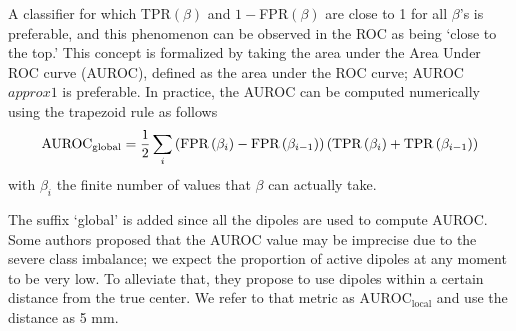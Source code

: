 A classifier for which TPR$(\beta)$ and $1-$FPR$(\beta)$ are close to 1 for all $\beta$'s is preferable, and this phenomenon can be observed in the ROC as being `close to the top.'
%
This concept is formalized by taking the area under the Area Under ROC curve (AUROC), defined as the area under the ROC curve; AUROC$approx 1$ is preferable.
%
In practice, the AUROC can be computed numerically using the trapezoid rule as follows
\begin{equation}
\text{AUROC}_\text{global} =
\frac{1}{2}
\sum_{i}
\left(  \text{FPR}\left( \beta_i \right)-\text{FPR}\left( \beta_{i-1} \right)  \right)
\left(  \text{TPR}\left( \beta_i \right)+\text{TPR}\left( \beta_{i-1} \right)  \right)
\end{equation}
with $\beta_i$ the finite number of values that $\beta$ can actually take.

The suffix `global' is added since all the dipoles are used to compute AUROC.
%
Some authors proposed that the AUROC value may be imprecise due to the severe class imbalance; we expect the proportion of active dipoles at any moment to be very low.
%
To alleviate that, they propose to use dipoles within a certain distance from the true center.
%
We refer to that metric as $\text{AUROC}_\text{local}$ and use the distance as 5 \si{mm}.


